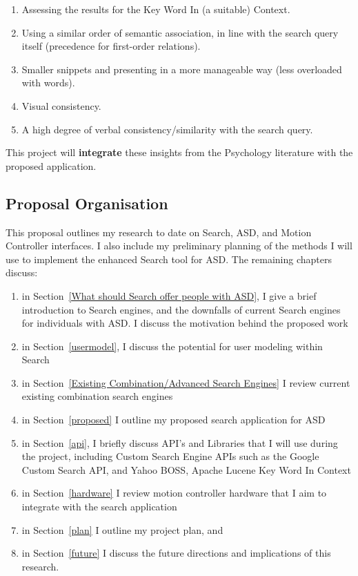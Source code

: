 \documentclass[10pt]{article}
\begin{document}
\begin{enumerate}
\item Assessing the results for the Key Word In (a suitable) Context.
\item Using a similar order of semantic association, in line with the search query itself (precedence for first-order relations). 
\item Smaller snippets and presenting in a more manageable way (less overloaded with words).
\item Visual consistency.
\item A high degree of verbal consistency/similarity with the search query.
\end{enumerate}

This project will \textbf{integrate} these insights from the Psychology literature with the proposed application.

\subsection{Proposal Organisation}

This proposal outlines my research to date on Search, ASD, and Motion Controller interfaces. I also include my preliminary planning of the methods I will use to implement the enhanced Search tool for ASD. The remaining chapters discuss:
\begin{enumerate}
\item in Section~\ref{What should Search offer people with ASD}, I give a brief introduction to Search engines, and the downfalls of current Search engines for individuals with ASD. I discuss the motivation behind the proposed work
\item in Section~\ref{usermodel}, I discuss the potential for user modeling within Search
\item in Section~\ref{Existing Combination/Advanced Search Engines} I review current existing combination search engines 
\item in Section~\ref{proposed} I outline my proposed search application for ASD
\item in Section~\ref{api}, I briefly discuss API's and Libraries that I will use during the project, including Custom Search Engine APIs such as the Google Custom Search API, and Yahoo BOSS, Apache Lucene Key Word In Context
\item in Section~\ref{hardware} I review motion controller hardware that I aim to integrate with the search application
\item in Section~\ref{plan} I outline my project plan, and
\item in Section~\ref{future} I discuss the future directions and implications of this research.
\end{enumerate}
\end{document}
